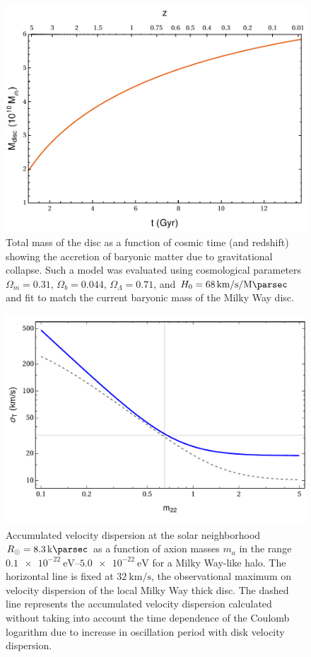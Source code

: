 \documentclass[usenatbib]{mnras}
\begin{document}
\begin{figure}
\includegraphics[width=\columnwidth]{infall_mass}
\vspace*{-5mm}
\caption{Total mass of the disc as a function of cosmic time (and redshift) showing the accretion of baryonic matter due to gravitational collapse. Such a model was evaluated using cosmological parameters $\Omega_{m} = 0.31$, $\Omega_{b} = 0.044$, $\Omega_{\Lambda} = 0.71$, and $H_0 = \SI{68}{\kilo\meter\per\second\per\mega\parsec}$ \citep{planck} and fit to match the current baryonic mass of the Milky Way disc.}
\label{fig:infall_mass}
\end{figure}

\begin{figure}
\includegraphics[width=\columnwidth]{FDM_mass_dep}
\vspace*{-5mm}
\caption{Accumulated velocity dispersion at the solar neighborhood $R_{\odot} = \SI{8.3}{\kilo\parsec}$ as a function of axion masses $m_{a}$ in the range $\SIrange{0.1 e-22}{5.0 e-22}{\electronvolt}$ for a Milky Way-like halo. The horizontal line is fixed at $\SI{32}{\kilo\meter\per\second}$, the observational maximum on velocity dispersion of the local Milky Way thick disc. The dashed line represents the accumulated velocity dispersion calculated without taking into account the time dependence of the Coulomb logarithm due to increase in oscillation period with disk velocity dispersion.}
\label{fig:mass_dep_heating}
\end{figure}
\end{document}
